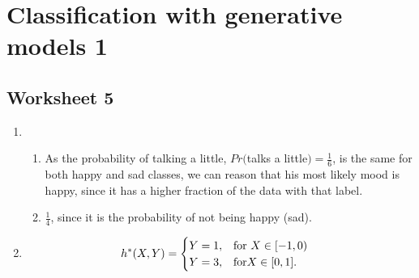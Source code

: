 \documentclass[12pt]{article}
\theoremstyle{plain}
\theoremstyle{definition}
\numberwithin{equation}{theorem}
\begin{document}
\section{Classification with generative models 1}
\subsection{Worksheet 5}
\begin{enumerate}
\item 
	\begin{enumerate}
	\item As the probability of talking a little, $Pr($talks a little$) = \frac{1}{6}$, is the same for both happy and sad classes, we can reason that his most likely mood is happy, since it has a higher fraction of the data with that label.
	\item $\frac{1}{4}$, since it is the probability of not being happy (sad).
	\end{enumerate}
\item \begin{align}
h^{*}(X ,Y) & = \begin{cases}
                Y= 1, & $for $X \in [-1,0)\\
                Y = 3, & $for$ X \in [0,1].
                    \end{cases}
             \end{align}
\end{enumerate}
\end{document}
